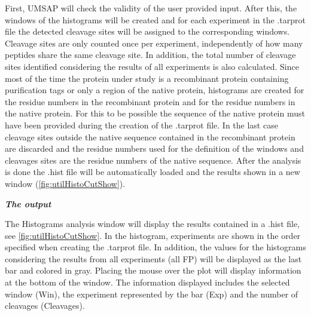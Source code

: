 First, UMSAP will check the validity of the user provided input. After this, the windows of the histograms will be created and for each experiment in the .tarprot file the detected cleavage sites will be assigned to the corresponding windows. Cleavage sites are only counted once per experiment, independently of how many peptides share the same cleavage site. In addition, the total number of cleavage sites identified considering the results of all experiments is also calculated. Since most of the time the protein under study is a recombinant protein containing purification tags or only a region of the native protein, histograms are created for the residue numbers in the recombinant protein and for the residue numbers in the native protein. For this to be possible the sequence of the native protein must have been provided during the creation of the .tarprot file. In the last case cleavage sites outside the native sequence contained in the recombinant protein are discarded and the residue numbers used for the definition of the windows and cleavages sites are the residue numbers of the native sequence. After the analysis is done the .hist file will be automatically loaded and the results shown in a new window (\autoref{fig:utilHistoCutShow}).

\textit{\textbf{The output}}

The Histograms analysis window will display the results contained in a .hist file, see \autoref{fig:utilHistoCutShow}. In the histogram, experiments are shown in the order specified when creating the .tarprot file. In addition, the values for the histograms considering the results from all experiments (all FP) will be displayed as the last bar and colored in gray. Placing the mouse over the plot will display information at the bottom of the window. The information displayed includes the selected window (Win), the experiment represented by the bar (Exp) and the number of cleavages (Cleavages).

